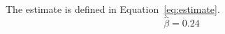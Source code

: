 \documentclass{article}
\begin{document}
The estimate is defined in Equation~\eqref{eq:estimate}.
\begin{equation}
\hat{\beta}=0.24
\label{eq:estimate}
\end{equation}
\end{document}
